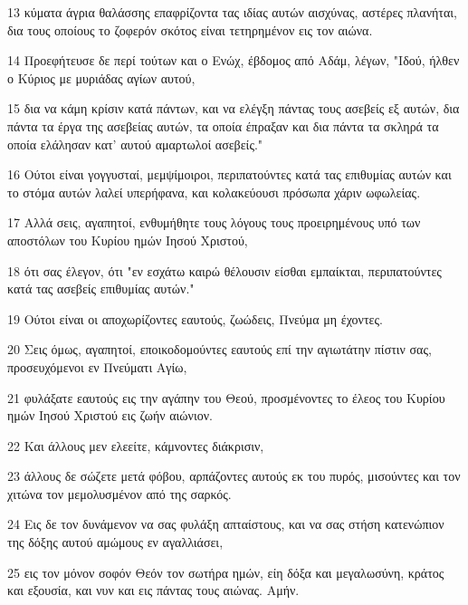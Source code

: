 \par 13 κύματα άγρια θαλάσσης επαφρίζοντα τας ιδίας αυτών αισχύνας, αστέρες πλανήται, δια τους οποίους το ζοφερόν σκότος είναι τετηρημένον εις τον αιώνα.
\par 14 Προεφήτευσε δε περί τούτων και ο Ενώχ, έβδομος από Αδάμ, λέγων, "Ιδού, ήλθεν ο Κύριος με μυριάδας αγίων αυτού,
\par 15 δια να κάμη κρίσιν κατά πάντων, και να ελέγξη πάντας τους ασεβείς εξ αυτών, δια πάντα τα έργα της ασεβείας αυτών, τα οποία έπραξαν και δια πάντα τα σκληρά τα οποία ελάλησαν κατ' αυτού αμαρτωλοί ασεβείς."
\par 16 Ούτοι είναι γογγυσταί, μεμψίμοιροι, περιπατούντες κατά τας επιθυμίας αυτών και το στόμα αυτών λαλεί υπερήφανα, και κολακεύουσι πρόσωπα χάριν ωφωλείας.
\par 17 Αλλά σεις, αγαπητοί, ενθυμήθητε τους λόγους τους προειρημένους υπό των αποστόλων του Κυρίου ημών Ιησού Χριστού,
\par 18 ότι σας έλεγον, ότι "εν εσχάτω καιρώ θέλουσιν είσθαι εμπαίκται, περιπατούντες κατά τας ασεβείς επιθυμίας αυτών."
\par 19 Ούτοι είναι οι αποχωρίζοντες εαυτούς, ζωώδεις, Πνεύμα μη έχοντες.
\par 20 Σεις όμως, αγαπητοί, εποικοδομούντες εαυτούς επί την αγιωτάτην πίστιν σας, προσευχόμενοι εν Πνεύματι Αγίω,
\par 21 φυλάξατε εαυτούς εις την αγάπην του Θεού, προσμένοντες το έλεος του Κυρίου ημών Ιησού Χριστού εις ζωήν αιώνιον.
\par 22 Και άλλους μεν ελεείτε, κάμνοντες διάκρισιν,
\par 23 άλλους δε σώζετε μετά φόβου, αρπάζοντες αυτούς εκ του πυρός, μισούντες και τον χιτώνα τον μεμολυσμένον από της σαρκός.
\par 24 Εις δε τον δυνάμενον να σας φυλάξη απταίστους, και να σας στήση κατενώπιον της δόξης αυτού αμώμους εν αγαλλιάσει,
\par 25 εις τον μόνον σοφόν Θεόν τον σωτήρα ημών, είη δόξα και μεγαλωσύνη, κράτος και εξουσία, και νυν και εις πάντας τους αιώνας. Αμήν.


